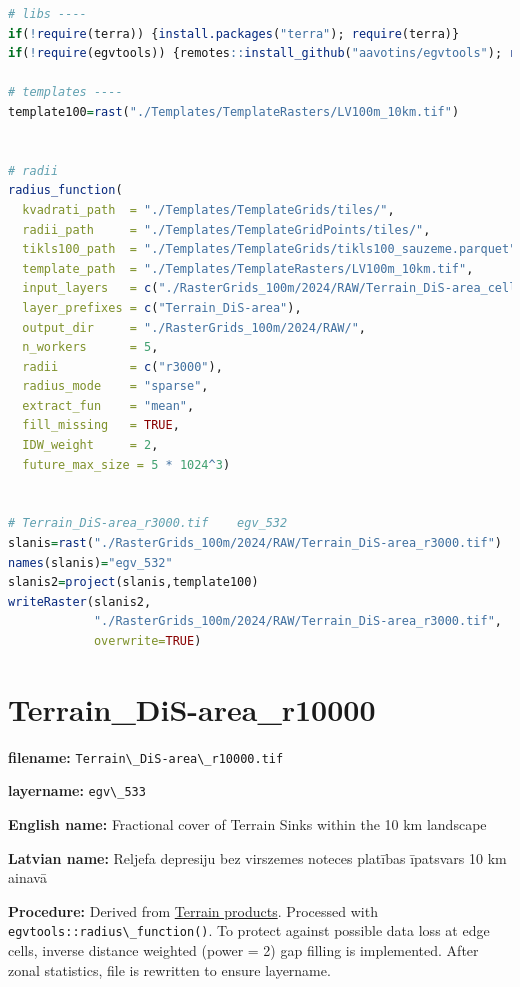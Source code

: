 \documentclass[
]{book}
\newcommand{\passthrough}[1]{#1}
\begin{document}
\begin{lstlisting}[language=R]
# libs ----
if(!require(terra)) {install.packages("terra"); require(terra)}
if(!require(egvtools)) {remotes::install_github("aavotins/egvtools"); require(egvtools)}

# templates ----
template100=rast("./Templates/TemplateRasters/LV100m_10km.tif")


# radii
radius_function(
  kvadrati_path  = "./Templates/TemplateGrids/tiles/",
  radii_path     = "./Templates/TemplateGridPoints/tiles/",
  tikls100_path  = "./Templates/TemplateGrids/tikls100_sauzeme.parquet",
  template_path  = "./Templates/TemplateRasters/LV100m_10km.tif",
  input_layers   = c("./RasterGrids_100m/2024/RAW/Terrain_DiS-area_cell.tif"),
  layer_prefixes = c("Terrain_DiS-area"),
  output_dir     = "./RasterGrids_100m/2024/RAW/",
  n_workers      = 5,
  radii          = c("r3000"),
  radius_mode    = "sparse",
  extract_fun    = "mean",
  fill_missing   = TRUE,
  IDW_weight     = 2,
  future_max_size = 5 * 1024^3)


# Terrain_DiS-area_r3000.tif    egv_532
slanis=rast("./RasterGrids_100m/2024/RAW/Terrain_DiS-area_r3000.tif")
names(slanis)="egv_532"
slanis2=project(slanis,template100)
writeRaster(slanis2,
            "./RasterGrids_100m/2024/RAW/Terrain_DiS-area_r3000.tif",
            overwrite=TRUE)
\end{lstlisting}

\section{Terrain\_DiS-area\_r10000}\label{ch06.533}

\textbf{filename:} \passthrough{\lstinline!Terrain\_DiS-area\_r10000.tif!}

\textbf{layername:} \passthrough{\lstinline!egv\_533!}

\textbf{English name:} Fractional cover of Terrain Sinks within the 10 km landscape

\textbf{Latvian name:} Reljefa depresiju bez virszemes noteces platības īpatsvars 10 km ainavā

\textbf{Procedure:} Derived from \hyperref[Ch05.01]{Terrain products}. Processed
with \passthrough{\lstinline!egvtools::radius\_function()!}. To protect against
possible data loss at edge cells, inverse distance weighted (power = 2) gap filling
is implemented. After zonal statistics, file is rewritten to ensure layername.
\end{document}
